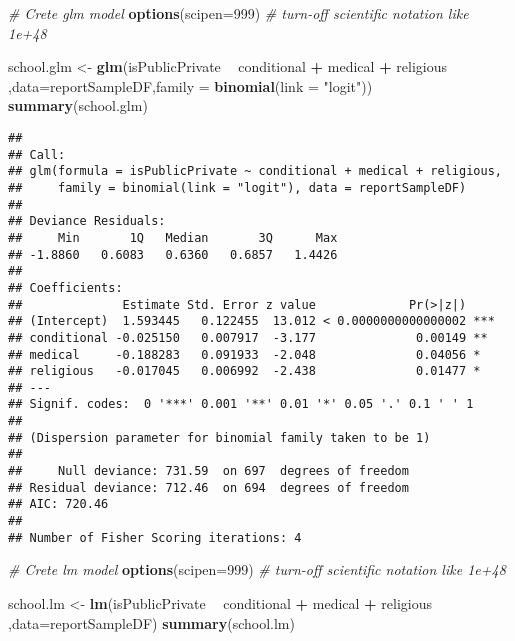 \documentclass[]{article}
\newenvironment{Shaded}{\begin{snugshade}}{\end{snugshade}}
\newcommand{\CommentTok}[1]{\textcolor[rgb]{0.56,0.35,0.01}{\textit{#1}}}
\newcommand{\DataTypeTok}[1]{\textcolor[rgb]{0.13,0.29,0.53}{#1}}
\newcommand{\DecValTok}[1]{\textcolor[rgb]{0.00,0.00,0.81}{#1}}
\newcommand{\KeywordTok}[1]{\textcolor[rgb]{0.13,0.29,0.53}{\textbf{#1}}}
\newcommand{\NormalTok}[1]{#1}
\newcommand{\OperatorTok}[1]{\textcolor[rgb]{0.81,0.36,0.00}{\textbf{#1}}}
\newcommand{\StringTok}[1]{\textcolor[rgb]{0.31,0.60,0.02}{#1}}
\begin{document}
\begin{Shaded}
\begin{Highlighting}[]
\CommentTok{# Crete glm model}
\KeywordTok{options}\NormalTok{(}\DataTypeTok{scipen=}\DecValTok{999}\NormalTok{)  }\CommentTok{# turn-off scientific notation like 1e+48}

\NormalTok{school.glm <-}\StringTok{ }\KeywordTok{glm}\NormalTok{(isPublicPrivate }\OperatorTok{~}\StringTok{ }\NormalTok{conditional }\OperatorTok{+}\StringTok{ }\NormalTok{medical }\OperatorTok{+}\StringTok{ }\NormalTok{religious ,}\DataTypeTok{data=}\NormalTok{reportSampleDF,}\DataTypeTok{family =} \KeywordTok{binomial}\NormalTok{(}\DataTypeTok{link =} \StringTok{"logit"}\NormalTok{)) }
\KeywordTok{summary}\NormalTok{(school.glm)}
\end{Highlighting}
\end{Shaded}

\begin{verbatim}
## 
## Call:
## glm(formula = isPublicPrivate ~ conditional + medical + religious, 
##     family = binomial(link = "logit"), data = reportSampleDF)
## 
## Deviance Residuals: 
##     Min       1Q   Median       3Q      Max  
## -1.8860   0.6083   0.6360   0.6857   1.4426  
## 
## Coefficients:
##              Estimate Std. Error z value             Pr(>|z|)    
## (Intercept)  1.593445   0.122455  13.012 < 0.0000000000000002 ***
## conditional -0.025150   0.007917  -3.177              0.00149 ** 
## medical     -0.188283   0.091933  -2.048              0.04056 *  
## religious   -0.017045   0.006992  -2.438              0.01477 *  
## ---
## Signif. codes:  0 '***' 0.001 '**' 0.01 '*' 0.05 '.' 0.1 ' ' 1
## 
## (Dispersion parameter for binomial family taken to be 1)
## 
##     Null deviance: 731.59  on 697  degrees of freedom
## Residual deviance: 712.46  on 694  degrees of freedom
## AIC: 720.46
## 
## Number of Fisher Scoring iterations: 4
\end{verbatim}

\begin{Shaded}
\begin{Highlighting}[]
\CommentTok{# Crete lm model}
\KeywordTok{options}\NormalTok{(}\DataTypeTok{scipen=}\DecValTok{999}\NormalTok{)  }\CommentTok{# turn-off scientific notation like 1e+48}

\NormalTok{school.lm <-}\StringTok{ }\KeywordTok{lm}\NormalTok{(isPublicPrivate }\OperatorTok{~}\StringTok{ }\NormalTok{conditional }\OperatorTok{+}\StringTok{ }\NormalTok{medical }\OperatorTok{+}\StringTok{ }\NormalTok{religious ,}\DataTypeTok{data=}\NormalTok{reportSampleDF)}
\KeywordTok{summary}\NormalTok{(school.lm)}
\end{Highlighting}
\end{Shaded}
\end{document}
